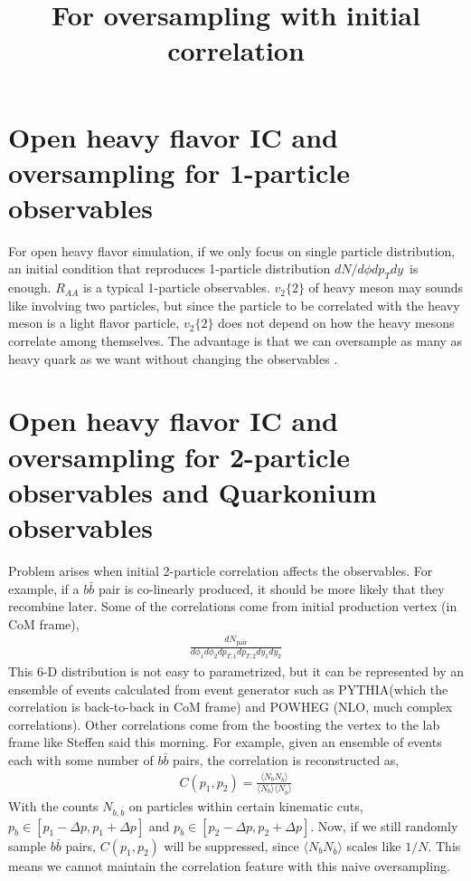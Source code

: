 \documentclass[10pt,a4paper,draft]{article}
\title{For oversampling with initial correlation}
\newcommand{\dndy}{$dN/d\phi dp_T dy$}
\begin{document}
\maketitle

\section{Open heavy flavor IC and oversampling for 1-particle observables }
For open heavy flavor simulation, if we only focus on single particle distribution, an initial condition that reproduces 1-particle distribution \dndy\ is enough. 
$R_{AA}$ is a typical 1-particle observables.
$v_2\{2\}$ of heavy meson may sounds like involving two particles, but since the particle to be correlated with the heavy meson is a light flavor particle, $v_2\{2\}$ does not depend on how the heavy mesons correlate among themselves.
The advantage is that we can oversample as many as heavy quark as we want without changing the observables .

\section{Open heavy flavor IC and oversampling for 2-particle observables and Quarkonium observables}
Problem arises when initial 2-particle correlation affects the observables. 
For example, if a $b\bar{b}$ pair is co-linearly produced, it should be more likely that they recombine later. 
Some of the correlations come from initial production vertex (in CoM frame),
\begin{eqnarray}
\frac{dN_{\textrm{pair}}}{d\phi_1 d\phi_2 dp_{T,1}dp_{T,2}dy_1dy_2}
\end{eqnarray}
This 6-D distribution is not easy to parametrized, but it can be represented by an ensemble of events calculated from event generator such as PYTHIA(which the correlation is back-to-back in CoM frame) and POWHEG (NLO, much complex correlations).
Other correlations come from the boosting the vertex to the lab frame like Steffen said this morning.
For example, given an ensemble of events each with some number of $b\bar{b}$ pairs, the correlation is reconstructed as,
\begin{eqnarray}
C(p_1, p_2) = \frac{\langle N_b N_{\bar{b}}\rangle}{ \langle N_b\rangle\langle N_{\bar{b}}\rangle}
\end{eqnarray}
With the counts $N_{b, \bar{b}}$ on particles within certain kinematic cuts, $p_b \in [p_1-\Delta p, p_1 + \Delta p]$ and $p_{\bar{b}} \in [p_2-\Delta p, p_2 +  \Delta p]$.
Now, if we still randomly sample $b\bar{b}$ pairs, $C(p_1, p_2)$ will be suppressed, since $\langle N_b N_{\bar{b}}\rangle$ scales like $1/N$.
This means we cannot maintain the correlation feature with this naive oversampling.
\end{document}
